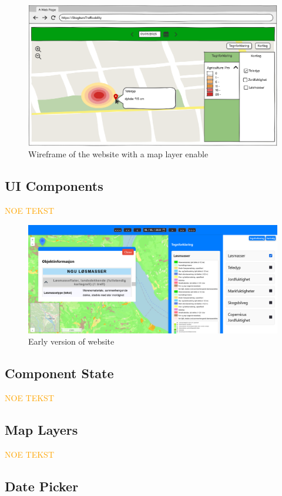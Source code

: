 \begin{figure}[h]
    \centering
    \includegraphics[width=0.6\linewidth]{figures/wireframe_website_sidebars_opened.pdf}
    \caption{Wireframe of the website with a map layer enable}
    \label{fig:wireframe_website_sidebars_opened}
\end{figure}

\subsection{UI Components}

\textcolor{orange}{NOE TEKST}
\begin{figure}[h]
    \centering
    \includegraphics[width=1\linewidth]{figures/website_layout_v1.pdf}
    \caption{Early version of website}
    \label{fig:website_layout_v1}
\end{figure}

\subsection{Component State} %

\textcolor{orange}{NOE TEKST}

\subsection{Map Layers}

\textcolor{orange}{NOE TEKST}

\subsection{Date Picker}

